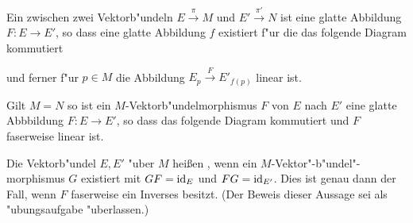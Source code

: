 Ein  zwischen zwei Vektorb"undeln $E \xrightarrow{\pi} M$ und $E' \xrightarrow{\pi'} N$ ist eine glatte Abbildung $F \colon E \to E'$, so dass eine glatte Abbildung $f$ existiert f"ur die das folgende Diagram kommutiert

\begin{center}\end{center}

und ferner f"ur $p \in M$ die Abbildung $E_p \xrightarrow{F} E'_{f(p)}$ linear ist.

Gilt $M = N$ so ist ein $M$-Vektorb"undelmorphismus $F$ von $E$ nach $E'$ eine glatte Abbbildung $F \colon E \to E'$, so dass das folgende Diagram kommutiert und $F$ faserweise linear ist.

\begin{center}\end{center}

Die Vektorb"undel $E,E'$ "uber $M$ heißen , wenn ein $M$-Vektor"-b"undel"-morphismus
$G$ existiert mit $G F = \operatorname{id}_E$ und $FG = \operatorname{id}_{E'}$.
Dies ist genau dann der Fall, wenn $F$ faserweise ein Inverses besitzt.
(Der Beweis dieser Aussage sei als "ubungsaufgabe "uberlassen.)

